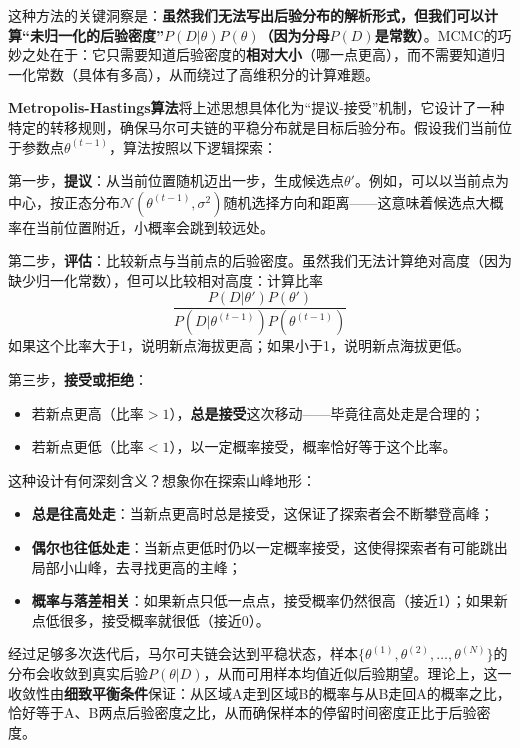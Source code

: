 这种方法的关键洞察是：\textbf{虽然我们无法写出后验分布的解析形式，但我们可以计算``未归一化的后验密度''$P(D|\theta)P(\theta)$（因为分母$P(D)$是常数）}。MCMC的巧妙之处在于：它只需要知道后验密度的\textbf{相对大小}（哪一点更高），而不需要知道归一化常数（具体有多高），从而绕过了高维积分的计算难题。

\textbf{Metropolis-Hastings算法}将上述思想具体化为``提议-接受''机制，它设计了一种特定的转移规则，确保马尔可夫链的平稳分布就是目标后验分布。假设我们当前位于参数点$\theta^{(t-1)}$，算法按照以下逻辑探索：

第一步，\textbf{提议}：从当前位置随机迈出一步，生成候选点$\theta'$。例如，可以以当前点为中心，按正态分布$\mathcal{N}(\theta^{(t-1)}, \sigma^2)$随机选择方向和距离——这意味着候选点大概率在当前位置附近，小概率会跳到较远处。

第二步，\textbf{评估}：比较新点与当前点的后验密度。虽然我们无法计算绝对高度（因为缺少归一化常数），但可以比较相对高度：计算比率
$$ \frac{P(D|\theta')P(\theta')}{P(D|\theta^{(t-1)})P(\theta^{(t-1)})} $$
如果这个比率大于1，说明新点海拔更高；如果小于1，说明新点海拔更低。

第三步，\textbf{接受或拒绝}：
\begin{itemize}
  \item 若新点更高（比率$> 1$），\textbf{总是接受}这次移动——毕竟往高处走是合理的；
  \item 若新点更低（比率$< 1$），以一定概率接受，概率恰好等于这个比率。
\end{itemize}

这种设计有何深刻含义？想象你在探索山峰地形：
\begin{itemize}
  \item \textbf{总是往高处走}：当新点更高时总是接受，这保证了探索者会不断攀登高峰；
  \item \textbf{偶尔也往低处走}：当新点更低时仍以一定概率接受，这使得探索者有可能跳出局部小山峰，去寻找更高的主峰；
  \item \textbf{概率与落差相关}：如果新点只低一点点，接受概率仍然很高（接近1）；如果新点低很多，接受概率就很低（接近0）。
\end{itemize}

经过足够多次迭代后，马尔可夫链会达到平稳状态，样本$\{\theta^{(1)}, \theta^{(2)}, \ldots, \theta^{(N)}\}$的分布会收敛到真实后验$P(\theta|D)$，从而可用样本均值近似后验期望。理论上，这一收敛性由\textbf{细致平衡条件}保证：从区域A走到区域B的概率与从B走回A的概率之比，恰好等于A、B两点后验密度之比，从而确保样本的停留时间密度正比于后验密度。

